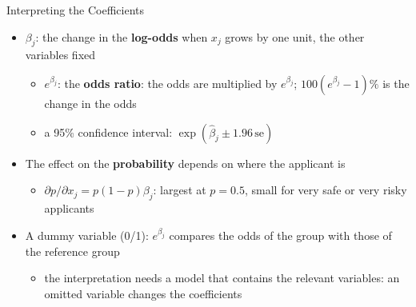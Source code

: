 \begin{frame}{Interpreting the Coefficients}
\itemsize{\small}
\begin{itemize}
    \item $\beta_j$: the change in the \textbf{log-odds} when $x_j$ grows by one unit, the other variables fixed
    \begin{itemize}
        \item $e^{\beta_j}$: the \textbf{odds ratio}: the odds are multiplied by $e^{\beta_j}$; $100(e^{\beta_j} - 1)\%$ is the change in the odds
        \item a 95\% confidence interval: $\exp(\hat\beta_j \pm 1.96\,\mathrm{se})$
    \end{itemize}
    \item The effect on the \textbf{probability} depends on where the applicant is
    \begin{itemize}
        \item $\partial p/\partial x_j = p(1 - p)\beta_j$: largest at $p = 0.5$, small for very safe or very risky applicants
    \end{itemize}
    \item A dummy variable (0/1): $e^{\beta_j}$ compares the odds of the group with those of the reference group
    \begin{itemize}
        \item the interpretation needs a model that contains the relevant variables: an omitted variable changes the coefficients
    \end{itemize}
\end{itemize}
\end{frame}


